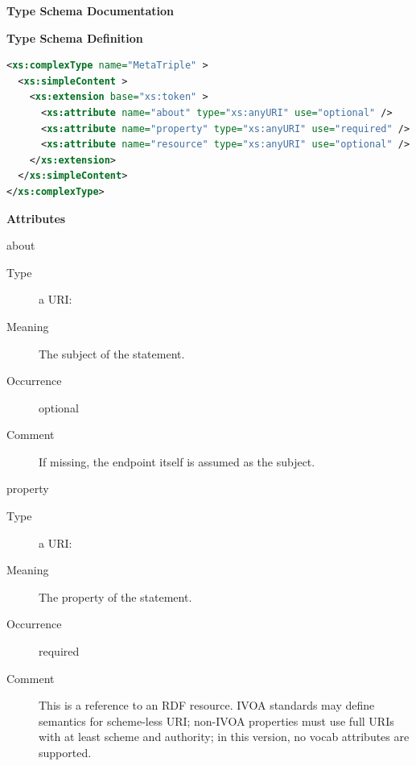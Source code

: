 \documentclass{ivoa}
\begin{document}
\begin{generated}
\begingroup
      	\renewcommand*\descriptionlabel[1]{%
      	\hbox to 5.5em{\emph{#1}\hfil}}\vspace{2ex}\noindent\textbf{ Type Schema Documentation}


\vspace{1ex}\noindent\textbf{ Type Schema Definition}

\begin{lstlisting}[language=XML,basicstyle=\footnotesize]
<xs:complexType name="MetaTriple" >
  <xs:simpleContent >
    <xs:extension base="xs:token" >
      <xs:attribute name="about" type="xs:anyURI" use="optional" />
      <xs:attribute name="property" type="xs:anyURI" use="required" />
      <xs:attribute name="resource" type="xs:anyURI" use="optional" />
    </xs:extension>
  </xs:simpleContent>
</xs:complexType>
\end{lstlisting}

\vspace{0.5ex}\noindent\textbf{ Attributes}

\begingroup\small\begin{bigdescription}
\item[about]
\begin{description}
\item[Type] a URI: 
\item[Meaning] 
              The subject of the statement.
            
\item[Occurrence] optional
\item[Comment] 
              If missing, the endpoint itself is assumed as the subject.
            
\end{description}
\item[property]
\begin{description}
\item[Type] a URI: 
\item[Meaning] 
              The property of the statement.
            
\item[Occurrence] required
\item[Comment] 
              This is a reference to an RDF resource.  IVOA standards may define
              semantics for scheme-less URI; non-IVOA properties must use
              full URIs with at least scheme and authority; in this
              version, no vocab attributes are supported.
            

\end{description}
\end{bigdescription}
\end{generated}
\end{document}
